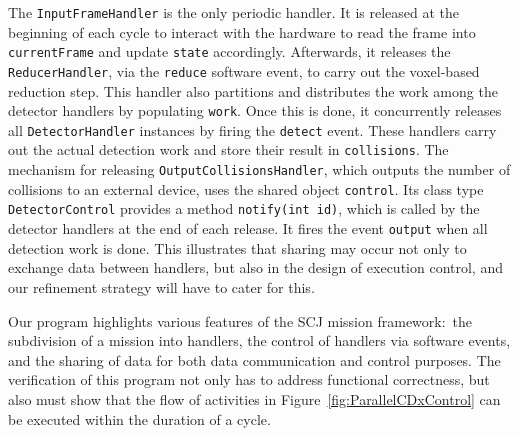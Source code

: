 The \verb"InputFrameHandler" is the only periodic handler. It is released at the beginning of each cycle to interact with the hardware to read the frame into \verb"currentFrame" and update \verb"state" accordingly. Afterwards, it releases the \verb"ReducerHandler", via the \verb"reduce" software event, to carry out the voxel-based reduction step. This handler also partitions and distributes the work among the detector handlers by populating \verb"work". Once this is done, it concurrently releases all \verb"DetectorHandler" instances by firing the \verb"detect" event. These handlers carry out the actual detection work and store their result in \verb"collisions". The mechanism for releasing \verb"OutputCollisionsHandler", which outputs the number of collisions to an external device, uses the shared object \verb"control". Its class type \texttt{DetectorControl} provides a method \texttt{notify(int id)}, which is called by the detector handlers at the end of each release. It fires the event \texttt{output} when all detection work is done. This illustrates that sharing may occur not only to exchange data between handlers, but also in the design of execution control, and our refinement strategy will have to cater for this.

Our program highlights various features of the SCJ mission framework:~the subdivision of a mission into handlers, the control of handlers via software events, and the sharing of data for both data communication and control purposes. The verification of this program not only has to address functional correctness, but also must show that the flow of activities in Figure~\ref{fig:ParallelCDxControl} can be executed within the duration of a cycle.
